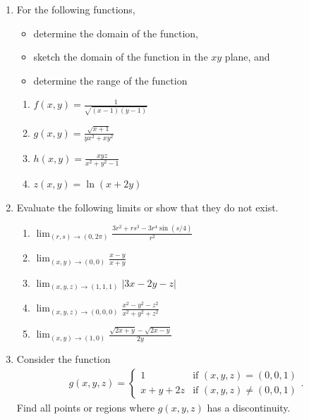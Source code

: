 \begin{enumerate}
\item 
For the following functions, 
\begin{itemize}
\item determine the domain of the function,
\item sketch the domain of the function in the $xy$ plane, and
\item determine the range of the function
\end{itemize}
\begin{enumerate}
  \item $f(x,y) = \frac{1}{\sqrt{(x-1)(y-1)}}$
  \item $g(x,y) = \frac{\sqrt{x+1}}{yx^2+xy^2}$
  \item $h(x,y) = \frac{xyz}{x^2+y^2-1}$
  \item $z(x,y) = \ln(x+2y)$
\end{enumerate}
\item 
Evaluate the following limits or show that they do not exist.  
\begin{enumerate}
\item $\displaystyle \lim_{(r,s)\rightarrow(0,2\pi) } \frac{3r^2+rs^3-3r^4\sin (s/4)}{r^2}$
\item $\displaystyle \lim_{(x,y)\rightarrow(0,0) } \frac{x-y}{x+y}$
\item $\displaystyle \lim_{(x,y,z)\rightarrow(1,1,1)} \big|3x - 2y - z \big|$
\item $\displaystyle \lim_{(x,y,z)\rightarrow(0,0,0) } \frac{x^2-y^2-z^2}{x^2+y^2+z^2}$
\item $\displaystyle \lim_{(x,y)\rightarrow(1,0) } \frac{\sqrt{2x+y}-\sqrt{2x-y}}{2y}$
\end{enumerate}
\item 
Consider the function
\begin{align*}
g(x,y,z) = \left\{
\begin{array}{rl}
1 & \text{if } (x,y,z) = (0,0,1) \\
x + y + 2z & \text{if } (x,y,z) \ne (0,0,1) 
\end{array} \right. .
\end{align*}
Find all points or regions where $g(x,y,z)$ has a discontinuity.

\end{enumerate}
